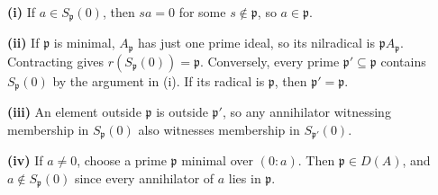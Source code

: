 \textbf{(i)} If $a\in S_{\mathfrak{p}}(0)$, then $sa=0$ for some $s\notin\mathfrak{p}$, so $a\in\mathfrak{p}$.

\textbf{(ii)} If $\mathfrak{p}$ is minimal, $A_{\mathfrak{p}}$ has just one prime ideal, so its nilradical is $\mathfrak{p}A_{\mathfrak{p}}$. Contracting gives $r(S_{\mathfrak{p}}(0))=\mathfrak{p}$. Conversely, every prime $\mathfrak{p}'\subseteq\mathfrak{p}$ contains $S_{\mathfrak{p}}(0)$ by the argument in (i). If its radical is $\mathfrak{p}$, then $\mathfrak{p}'=\mathfrak{p}$.

\textbf{(iii)} An element outside $\mathfrak{p}$ is outside $\mathfrak{p}'$, so any annihilator witnessing membership in $S_{\mathfrak{p}}(0)$ also witnesses membership in $S_{\mathfrak{p}'}(0)$.

\textbf{(iv)} If $a\ne0$, choose a prime $\mathfrak{p}$ minimal over $(0:a)$. Then $\mathfrak{p}\in D(A)$, and $a\notin S_{\mathfrak{p}}(0)$ since every annihilator of $a$ lies in $\mathfrak{p}$.
